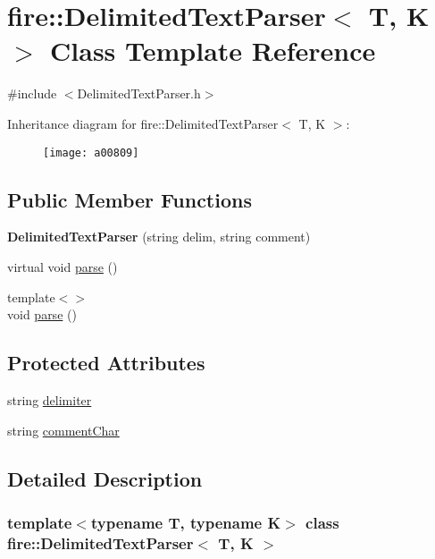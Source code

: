 \hypertarget{a00809}{}\section{fire\+:\+:Delimited\+Text\+Parser$<$ T, K $>$ Class Template Reference}
\label{a00809}


{\ttfamily \#include $<$Delimited\+Text\+Parser.\+h$>$}

Inheritance diagram for fire\+:\+:Delimited\+Text\+Parser$<$ T, K $>$\+:\begin{figure}[H]
\begin{center}
\leavevmode
\texttt{[image: a00809]}
\end{center}
\end{figure}
\subsection*{Public Member Functions}
\begin{DoxyCompactItemize}
\item 
\mbox{\label{a00809_aa1f041ebbf0bf72145e8bd20bf95f3f4}} 
{\bfseries Delimited\+Text\+Parser} (string delim, string comment)
\item 
virtual void \hyperlink{a00809_a686df5548771cae833d5e721442a821a}{parse} ()
\item 
{\footnotesize template$<$$>$ }\\void \hyperlink{a00809_a773fa7ed28cb9d8c384ad94bd81fc93f}{parse} ()
\end{DoxyCompactItemize}
\subsection*{Protected Attributes}
\begin{DoxyCompactItemize}
\item 
string \hyperlink{a00809_ac817fc333b53611a41f446977461bdbf}{delimiter}
\item 
string \hyperlink{a00809_acdd7b27b8109ed41e7d9bc5e6de72e93}{comment\+Char}
\end{DoxyCompactItemize}


\subsection{Detailed Description}
\subsubsection*{template$<$typename T, typename K$>$\newline
class fire\+::\+Delimited\+Text\+Parser$<$ T, K $>$}

